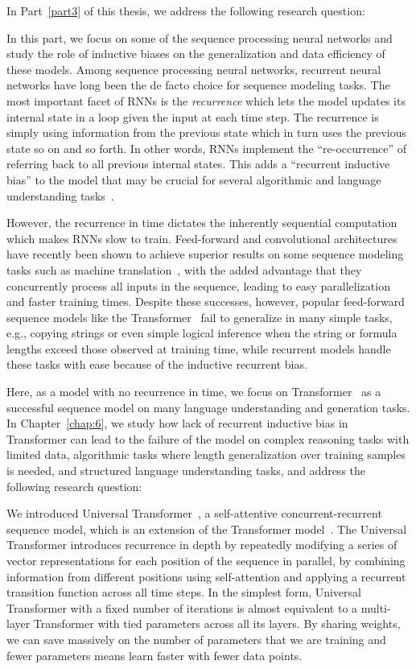 In Part~\ref{part3} of this thesis, we address the following research question:

In this part, we focus on some of the sequence processing neural networks and study the role of inductive biases on the generalization and data efficiency of these models. 
Among sequence processing neural networks, recurrent neural networks have long been the de facto choice for sequence modeling tasks. The most important facet of RNNs is the \emph{recurrence} which lets the model updates its internal state in a loop given the input at each time step. The recurrence is simply using information from the previous state which in turn uses the previous state so on and so forth.  In other words, RNNs implement the ``re-occurrence'' of referring back to all previous internal states. This adds a ``recurrent inductive bias'' to the model that may be crucial for several algorithmic and language understanding tasks~\cite{tran2016recurrent,Dehghani:ICLR:2019}.

However, the recurrence in time dictates the inherently sequential computation which makes RNNs slow to train. Feed-forward and convolutional architectures have recently been shown to achieve superior results on some sequence modeling tasks such as machine translation~\citep{vaswani2017attention, NalBytenet2017}, with the added advantage that they concurrently process all inputs in the sequence, leading to easy parallelization and faster training times. Despite these successes, however, popular feed-forward sequence models like the Transformer~\citep{vaswani2017attention} fail to generalize in many simple tasks, e.g., copying strings or even simple logical inference when the string or formula lengths exceed those observed at training time, while recurrent models handle these tasks with ease because of the inductive recurrent bias.

Here, as a model with no recurrence in time, we focus on Transformer~\citep{vaswani2017attention} as a successful sequence model on many language understanding and generation tasks. In Chapter~\ref{chap:6}, we study how lack of recurrent inductive bias in Transformer can lead to the failure of the model on complex reasoning tasks with limited data, algorithmic tasks where length generalization over training samples is needed, and structured language understanding tasks, and address the following research question:

We introduced Universal Transformer~\citep{Dehghani:ICLR:2019}, a self-attentive concurrent-recurrent sequence model, which is an extension of the Transformer model~\citep{vaswani2017attention}. The Universal Transformer introduces recurrence in depth by repeatedly modifying a series of vector representations for each position of the sequence in parallel, by combining information from different positions using self-attention and applying a recurrent transition function across all time steps. 
In the simplest form, Universal Transformer with a fixed number of iterations is almost equivalent to a multi-layer Transformer with tied parameters across all its layers. By sharing weights, we can save massively on the number of parameters that we are training and fewer parameters means learn faster with fewer data points. 


